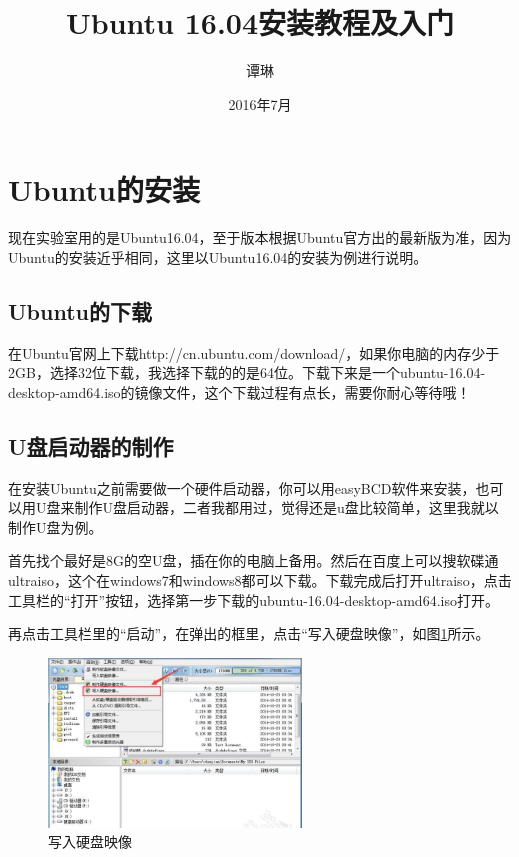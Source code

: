 \documentclass{article}
\begin{document}
\title{\vspace{-2em}Ubuntu 16.04安装教程及入门\vspace{0.7em}}%
\author{谭琳}%
\date{\vspace{-0.7em}2016年7月\vspace{-0.7em}}%
\maketitle\thispagestyle{fancy}%
\maketitle
\tableofcontents 
\section{Ubuntu的安装}

现在实验室用的是Ubuntu16.04，至于版本根据Ubuntu官方出的最新版为准，因为Ubuntu的安装近乎相同，这里以Ubuntu16.04的安装为例进行说明。

\subsection{Ubuntu的下载}

  在Ubuntu官网上下载http://cn.ubuntu.com/download/，如果你电脑的内存少于2GB，选择32位下载，我选择下载的的是64位。下载下来是一个ubuntu-16.04-desktop-amd64.iso的镜像文件，这个下载过程有点长，需要你耐心等待哦！

\subsection{U盘启动器的制作}

  在安装Ubuntu之前需要做一个硬件启动器，你可以用easyBCD软件来安装，也可以用U盘来制作U盘启动器，二者我都用过，觉得还是u盘比较简单，这里我就以制作U盘为例。

  首先找个最好是8G的空U盘，插在你的电脑上备用。然后在百度上可以搜软碟通ultraiso，这个在windows7和windows8都可以下载。下载完成后打开ultraiso，点击工具栏的“打开”按钮，选择第一步下载的ubuntu-16.04-desktop-amd64.iso打开。

  再点击工具栏里的“启动”，在弹出的框里，点击“写入硬盘映像”，如图\ref{tu1}所示。
\begin{figure}[!htb] %
\centering
\includegraphics[width=0.6\textwidth]{tu1.jpeg}
\caption{\small 写入硬盘映像}
\label{tu1}
\end{figure}  
\end{document}
